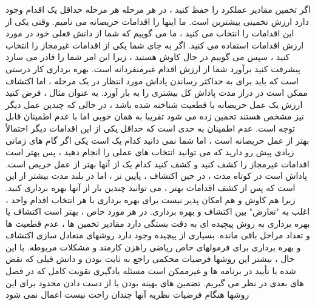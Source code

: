 اگر تخمین مقادیر عملکرد را حفظ کنید ، در هر مرحله هر مرحله حداقل یک اقدام وجود دارد
ارزش تخمینی بیشترین است. ما اینها را اقدامات حریصانه می نامیم. وقتی یکی از این اقدامات را انتخاب می کنید ،
ما می گوییم که شما از دانش فعلی خود در مورد ارزش اقدامات استفاده می کنید. اگر به جای شما
یکی از اقدامات غیرمجاز را انتخاب کنید ، سپس می گوییم در حال کاوش هستید ، زیرا این امر شما را قادر می سازد پیشرفت کنید
برآورد شما از ارزش اقدام غیرمنفردانه است. بهره برداری کار درستی است که باید برای به حداکثر رساندن
پاداش مورد انتظار در یک مرحله ، اما اکتشاف ممکن است در دراز مدت پاداش کل بیشتری را به بار آورد.
به عنوان مثال ، فرض کنید ارزش یک عمل حریصانه با قطعیت شناخته شده باشد ، در حالی که چندین عمل دیگر نیز مشخص هستند
تخمین زده می شود تقریبا به همان خوبی اما با عدم اطمینان قابل توجه است. عدم اطمینان به حدی است که حداقل
یکی از این اقدامات دیگر احتمالاً بهتر از عمل حریصانه است ، اما شما نمی دانید کدام یک است
یکی اگر گام های زمانی زیادی پیش رو دارید که می توانید انتخاب های عملی را انجام دهید ، پس بهتر است
اقدامات غیرمجاز را کشف کنید و کشف کنید کدام یک از آنها بهتر از عمل حریص است. پاداش است
در کوتاه مدت ، در حین اکتشاف ، پایین تر ، اما در بلند مدت بیشتر از این است که پس از کشف
اقدامات بهتر ، می توانید چندین بار از آنها بهره برداری کنید. زیرا هم کاوش و هم امکان پذیر نیست
برای بهره برداری با هر انتخاب اقدام واحد ، اغلب به "تعارض" بین اکتشاف و
بهره برداری.
در هر مورد خاص ، بهتر است اکتشاف یا بهره برداری به روش پیچیده ای به دقت بستگی دارد
مقادیر تخمین ها ، عدم قطعیت ها و تعداد مراحل باقی مانده. بسیاری از پیچیده وجود دارد
روشهای متعادل سازی اکتشاف و بهره برداری برای فرمولهای خاص ریاضی راهزن کارمند و مشکلات مربوطه. با این حال ، بیشتر این روشها فرضیات محکمی راجع به
ثابت بودن و دانش قبلی که نقض شده یا تأیید در برنامه ها و غیرممکن است
مسئله یادگیری تقویت کامل که در فصل های بعدی در نظر می گیریم. تضمین های
بهینه بودن یا از دست دادن محدود برای این روشها هنگام فرضیات نظریه آنها چندان راحت نیست
اعمال نمی شود


